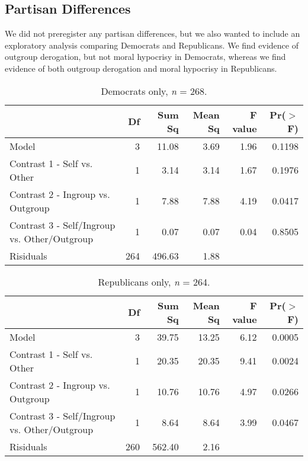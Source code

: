 \documentclass[12pt,]{article}
\begin{document}

\newpage
\subsection{Partisan Differences}
\label{appendix:p_dif2}

We did not preregister any partisan differences, but we also wanted to include an exploratory analysis comparing Democrats and Republicans.  We find evidence of outgroup derogation, but not moral hypocrisy in Democrats, whereas we find evidence of both outgroup derogation and moral hypocrisy in Republicans. 

\vspace{0.6cm}

\begin{table}[ht]
\centering
\begin{tabular}{lrrrrr}
  \hline
 & Df & Sum Sq & Mean Sq & F value & Pr($>$F) \\ 
  \hline
Model & 3 & 11.08 & 3.69 & 1.96 & 0.1198 \\ 
  Contrast 1 - Self vs. Other & 1 & 3.14 & 3.14 & 1.67 & 0.1976 \\ 
  Contrast 2 - Ingroup vs. Outgroup & 1 & 7.88 & 7.88 & 4.19 & 0.0417 \\ 
  Contrast 3 - Self/Ingroup vs. Other/Outgroup & 1 & 0.07 & 0.07 & 0.04 & 0.8505 \\ 
  Risiduals & 264 & 496.63 & 1.88 &  &  \\ 
   \hline
\end{tabular}
\caption{Democrats only, \emph{n} = 268.} 
\label{dems2}
\end{table}

\vspace{0.6cm}

\begin{table}[ht]
\centering
\begin{tabular}{lrrrrr}
  \hline
 & Df & Sum Sq & Mean Sq & F value & Pr($>$F) \\ 
  \hline
Model & 3 & 39.75 & 13.25 & 6.12 & 0.0005 \\ 
  Contrast 1 - Self vs. Other & 1 & 20.35 & 20.35 & 9.41 & 0.0024 \\ 
  Contrast 2 - Ingroup vs. Outgroup & 1 & 10.76 & 10.76 & 4.97 & 0.0266 \\ 
  Contrast 3 - Self/Ingroup vs. Other/Outgroup & 1 & 8.64 & 8.64 & 3.99 & 0.0467 \\ 
  Risiduals & 260 & 562.40 & 2.16 &  &  \\ 
   \hline
\end{tabular}
\caption{Republicans only, \emph{n} = 264. } 
\label{reps2}
\end{table}
\end{document}
